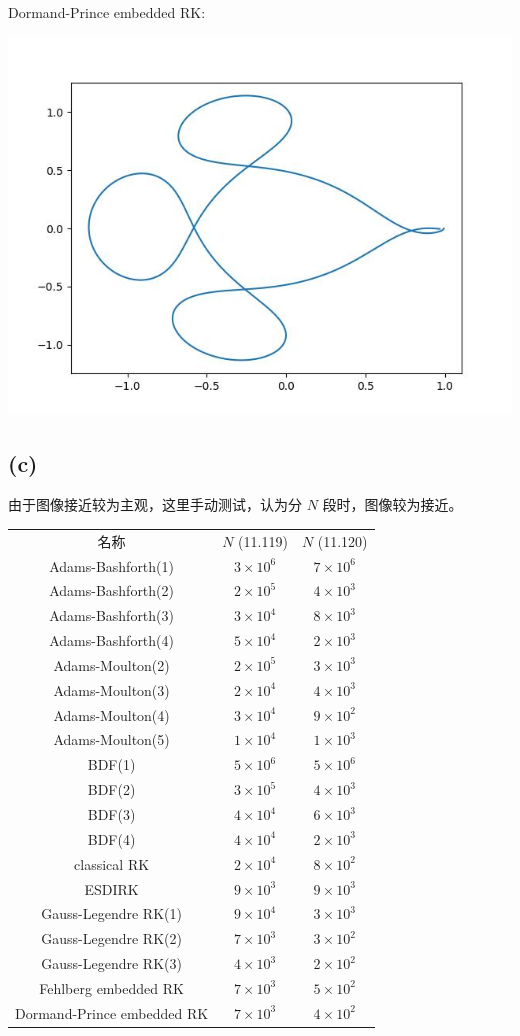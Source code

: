 \documentclass[12pt]{ctexart}
\begin{document}
Dormand-Prince embedded RK:

\includegraphics[scale=0.8]{Dormand-Prince embedded RK.jpg}

\subsection*{(c)}

由于图像接近较为主观，这里手动测试，认为分 $N$ 段时，图像较为接近。

\begin{tabular}{c|c|c}
	名称&$N$ (11.119) &$N$ (11.120) \\
	Adams-Bashforth(1)&$3\times 10^6$&$7\times 10^6$\\
	Adams-Bashforth(2)&$2\times 10^5$&$4\times 10^3$\\
	Adams-Bashforth(3)&$3\times 10^4$&$8\times 10^3$\\
	Adams-Bashforth(4)&$5\times 10^4$&$2\times 10^3$\\
	Adams-Moulton(2)&$2\times 10^5$&$3\times 10^3$\\
	Adams-Moulton(3)&$2\times 10^4$&$4\times 10^3$\\
	Adams-Moulton(4)&$3\times 10^4$&$9\times 10^2$\\
	Adams-Moulton(5)&$1\times 10^4$&$1\times 10^3$\\
	BDF(1)&$5\times 10^6$&$5\times 10^6$\\
	BDF(2)&$3\times 10^5$&$4\times 10^3$\\
	BDF(3)&$4\times 10^4$&$6\times 10^3$\\
	BDF(4)&$4\times 10^4$&$2\times 10^3$\\
	classical RK&$2\times 10^4$&$8\times 10^2$\\
	ESDIRK&$9\times 10^3$&$9\times 10^3$\\
	Gauss-Legendre RK(1)&$9\times 10^4$&$3\times 10^3$\\
	Gauss-Legendre RK(2)&$7\times 10^3$&$3\times 10^2$\\
	Gauss-Legendre RK(3)&$4\times 10^3$&$2\times 10^2$\\
	Fehlberg embedded RK&$7\times 10^3$&$5\times 10^2$\\
	Dormand-Prince embedded RK&$7\times 10^3$&$4\times 10^2$\\
\end{tabular}
\end{document}
